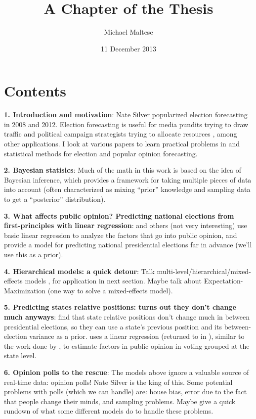 \documentclass[12pt]{report}
\title{\textbf{A Chapter of the Thesis}}
\author{Michael Maltese}
\date{11 December 2013}
\begin{document}
\maketitle

\chapter*{Contents}

\textbf{1. Introduction and motivation}: Nate Silver \citeyearpar{Silver:2012aa} popularized election forecasting in 2008 and 2012. Election forecasting is useful for media pundits trying to draw traffic and political campaign strategists trying to allocate resources \citep{Strauss:2007aa}, among other applications. I look at various papers to learn practical problems in and statistical methods for election and popular opinion forecasting.

\textbf{2. Bayesian statisics}: Much of the math in this work is based on the idea of Bayesian inference, which provides a framework for taking multiple pieces of data into account (often characterized as mixing ``prior'' knowledge and sampling data to get a ``posterior'' distribution).

\textbf{3. What affects public opinion? Predicting national elections from first-principles with linear regression}: \cite{Hibbs:2008aa} and others (not very interesting) use basic linear regression to analyze the factors that go into public opinion, and provide a model for predicting national presidential elections far in advance (we'll use this as a prior).

\textbf{4. Hierarchical models: a quick detour}: Talk multi-level/hierarchical/mixed-effects models \citep{Gelman:2006aa,Gelman:2007aa}, for application in next section. Maybe talk about Expectation-Maximization (one way to solve a mixed-effects model).

\textbf{5. Predicting states relative positions: turns out they don't change much anyways}: \cite{Lock:2010aa} find that state relative positions don't change much in between presidential elections, so they can use a state's previous position and its between-election variance as a prior. \cite{Campbell:1992aa} uses a linear regression (returned to in \citealp{Campbell:2006aa}), similar to the work done by \cite{Hibbs:2008aa}, to estimate factors in public opinion in  voting grouped at the state level.

\textbf{6. Opinion polls to the rescue}: The models above ignore a valuable source of real-time data: opinion polls! Nate Silver \citeyearpar{Silver:2012aa} is the king of this. Some potential problems with polls (which we can handle) are: house bias, error due to the fact that people change their minds, and sampling problems. Maybe give a quick rundown of what some different models do to handle these problems.
\end{document}
